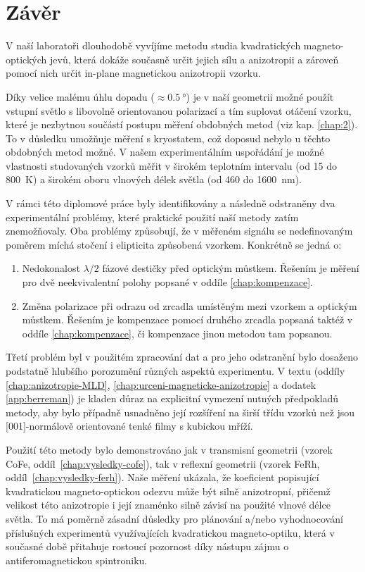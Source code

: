 \chapter*{Závěr}

V naší laboratoři dlouhodobě vyvíjíme metodu studia kvadratických mag\-ne\-to-optických jevů, která dokáže současně určit jejich sílu a anizotropii a zároveň pomocí nich určit in-plane magnetickou anizotropii vzorku.

Díky velice malému úhlu dopadu ($\approx\SI{0.5}{\degree}$) je v naší geometrii možné použít vstupní světlo s libovolně orientovanou polarizací a tím suplovat otáčení vzorku, které je nezbytnou součástí postupu měření obdobných metod (viz kap. \ref{chap:2}).
To v důsledku umožňuje měření s kryostatem, což doposud nebylo u těchto obdobných metod možné.
V našem experimentálním uspořádání je možné vlastnosti studovaných vzorků měřit v širokém teplotním intervalu (od 15 do \SI{800}{\kelvin}) a širokém oboru vlnových délek světla (od 460 do \SI{1600}{\nano\meter}).

V rámci této diplomové práce byly identifikovány a následně odstraněny dva experimentální problémy, které praktické použití naší metody zatím znemožňovaly.
Oba problémy způsobují, že v měřeném signálu se nedefinovaným poměrem míchá stočení i elipticita způsobená vzorkem.
Konkrétně se jedná o:
\begin{enumerate}
    \item Nedokonalost $\lambda/2$ fázové destičky před optickým můstkem. 
        Řešením je měření pro dvě neekvivalentní polohy popsané v oddíle \ref{chap:kompenzace}.
    \item Změna polarizace při odrazu od zrcadla umístěným mezi vzorkem a optickým můstkem.
        Řešením je kompenzace pomocí druhého zrcadla popsaná taktéž v oddíle \ref{chap:kompenzace}, či kompenzace jinou metodou tam popsanou.
\end{enumerate}

Třetí problém byl v použitém zpracování dat a pro jeho odstranění bylo dosaženo podstatně hlubšího porozumění různých aspektů experimentu.
V textu (oddíly \ref{chap:anizotropie-MLD}, \ref{chap:urceni-magneticke-anizotropie} a dodatek \ref{app:berreman}) je kladen důraz na explicitní vymezení nutných předpokladů metody, aby bylo případně usnadněno její rozšíření na širší třídu vzorků než jsou [001]-normálově orientované tenké filmy s kubickou mříží.

Použití této metody bylo demonstrováno jak v transmisní geometrii (vzorek CoFe, oddíl~\ref{chap:vysledky-cofe}), tak v reflexní geometrii (vzorek FeRh, oddíl~\ref{chap:vysledky-ferh}).
Naše měření ukázala, že koeficient popisující kvadratickou magneto-optickou odezvu může být silně anizotropní, přičemž velikost této anizotropie i její znaménko silně závisí na použité vlnové délce světla.
To má poměrně zásadní důsledky pro plánování a/nebo vyhodnocování příslušných experimentů využívajících kvadratickou magneto-optiku, která v současné době přitahuje rostoucí pozornost díky nástupu zájmu o antiferomagnetickou spintroniku.
